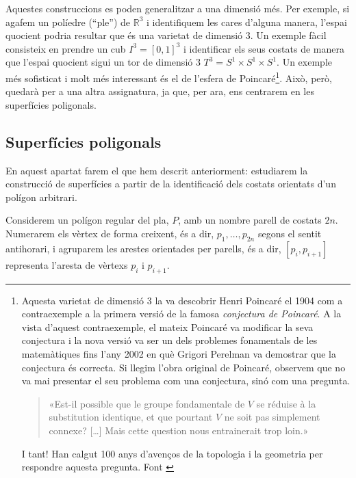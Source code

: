 \documentclass[../main.tex]{subfiles}
\begin{document}
Aquestes construccions es poden generalitzar a una dimensió més. Per exemple, si agafem un políedre (``ple'') de $\mathbb{R}^3$ i identifiquem les cares d'alguna manera, l'espai quocient podria resultar que és una varietat de dimensió 3. Un exemple fàcil consisteix en prendre un cub $I^3 = [0,1]^3$ i identificar els seus costats de manera que l'espai quocient sigui un tor de dimensió 3 $T^3 = S^1\times S^1\times S^1$. Un exemple més sofisticat i molt més interessant és el de l'esfera de Poincaré\footnote{Aquesta varietat de dimensió 3 la va descobrir Henri Poincaré el 1904 com a contraexemple a la primera versió de la famosa \textit{conjectura de Poincaré}. A la vista d'aquest contraexemple, el mateix Poincaré va modificar la seva conjectura i la nova versió va ser un dels problemes fonamentals de les matemàtiques fins l'any 2002 en què Grigori Perelman va demostrar que la conjectura és correcta. Si llegim l'obra original de Poincaré, observem que no va mai presentar el seu problema com una conjectura, sinó com una pregunta. \begin{quote}
    «Est-il possible que le groupe fondamentale de $V$ se réduise à la substitution identique, et que pourtant $V$ ne soit pas simplement connexe? [\ldots] Mais cette question nous entrainerait trop loin.»
\end{quote} I tant! Han calgut 100 anys d'avenços de la topologia i la geometria per respondre aquesta pregunta. Font \cite{aguade}}. Això, però, quedarà per a una altra assignatura, ja que, per ara, ens centrarem en les superfícies poligonals.


\subsection{Superfícies poligonals}

En aquest apartat farem el que hem descrit anteriorment: estudiarem la construcció de superfícies a partir de la identificació dels costats orientats d'un polígon arbitrari.

Considerem un polígon regular del pla, $P$, amb un nombre parell de costats $2n$. Numerarem els vèrtex de forma creixent, és a dir, $p_1,\ldots,p_{2n}$ segons el sentit antihorari, i agruparem les arestes orientades per parells, és a dir, $[p_i,p_{i+1}]$ representa l'aresta de vèrtexs $p_i$ i $p_{i+1}$.
\end{document}
